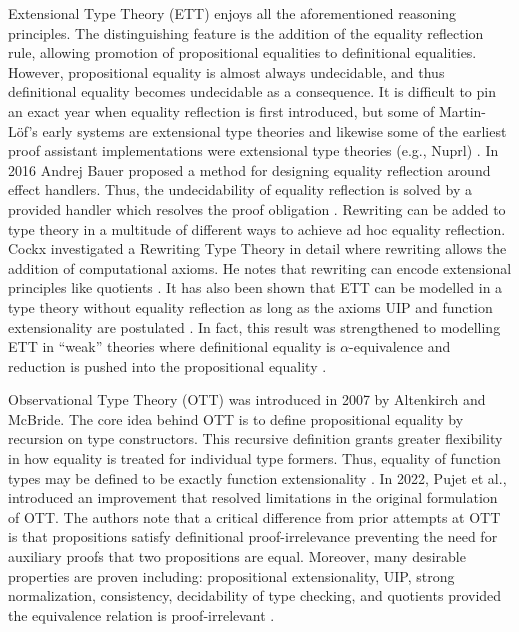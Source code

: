 Extensional Type Theory (ETT) enjoys all the aforementioned reasoning principles.
The distinguishing feature is the addition of the equality reflection rule, allowing promotion of propositional equalities to definitional equalities.
However, propositional equality is almost always undecidable, and thus definitional equality becomes undecidable as a consequence.
It is difficult to pin an exact year when equality reflection is first introduced, but some of Martin-L\"{o}f's early systems are extensional type theories and likewise some of the earliest proof assistant implementations were extensional type theories (e.g., Nuprl) \cite{constable1986}.
In 2016 Andrej Bauer proposed a method for designing equality reflection around effect handlers.
Thus, the undecidability of equality reflection is solved by a provided handler which resolves the proof obligation \cite{bauer2016}.
Rewriting can be added to type theory in a multitude of different ways to achieve ad hoc equality reflection.
Cockx investigated a Rewriting Type Theory in detail where rewriting allows the addition of computational axioms.
He notes that rewriting can encode extensional principles like quotients \cite{cockx2020, cockx2021}.
It has also been shown that ETT can be modelled in a type theory without equality reflection as long as the axioms UIP and function extensionality are postulated \cite{winterhalter2019}.
In fact, this result was strengthened to modelling ETT in ``weak'' theories where definitional equality is $\alpha$-equivalence and reduction is pushed into the propositional equality \cite{boulier2019}.

Observational Type Theory (OTT) was introduced in 2007 by Altenkirch and McBride.
The core idea behind OTT is to define propositional equality by recursion on type constructors.
This recursive definition grants greater flexibility in how equality is treated for individual type formers.
Thus, equality of function types may be defined to be exactly function extensionality \cite{altenkirch2007}.
In 2022, Pujet et al., introduced an improvement that resolved limitations in the original formulation of OTT.
The authors note that a critical difference from prior attempts at OTT is that propositions satisfy definitional proof-irrelevance preventing the need for auxiliary proofs that two propositions are equal.
Moreover, many desirable properties are proven including: propositional extensionality, UIP, strong normalization, consistency, decidability of type checking, and quotients provided the equivalence relation is proof-irrelevant \cite{pujet2022}.

